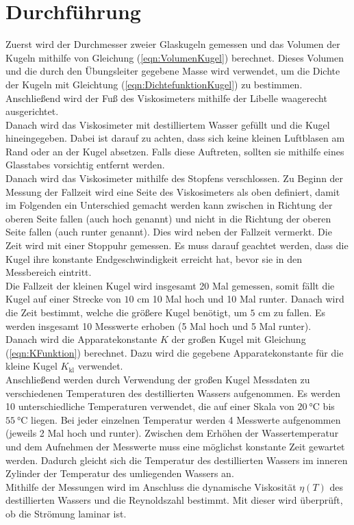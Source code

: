 \section{Durchführung}
\label{sec:Durchführung}
Zuerst wird der Durchmesser zweier Glaskugeln gemessen und das Volumen der Kugeln mithilfe von Gleichung
(\ref{eqn:VolumenKugel}) berechnet. Dieses Volumen und die durch den Übungsleiter gegebene Masse 
wird verwendet, um die Dichte der Kugeln mit Gleichtung 
(\ref{eqn:DichtefunktionKugel}) zu bestimmen.  
Anschließend wird der Fuß des Viskosimeters mithilfe der Libelle waagerecht ausgerichtet. \\
Danach wird das Viskosimeter mit destilliertem Wasser gefüllt und die Kugel hineingegeben. 
Dabei ist darauf zu achten, dass sich keine kleinen Luftblasen am Rand oder an der Kugel absetzen. 
Falls diese Auftreten, sollten sie mithilfe eines Glasstabes vorsichtig entfernt werden. \\
Danach wird 
das Viskosimeter mithilfe des Stopfens verschlossen. Zu Beginn der Messung der Fallzeit wird eine Seite 
des Viskosimeters als oben definiert, damit im Folgenden ein Unterschied gemacht werden kann zwischen 
\glqq in Richtung der oberen Seite fallen\grqq{} (auch \glqq hoch\grqq{} genannt) und \glqq nicht in die Richtung der 
oberen Seite fallen\grqq{}
(auch \glqq runter\grqq{} genannt). Dies wird neben der Fallzeit vermerkt. Die Zeit wird mit einer Stoppuhr gemessen. 
Es muss darauf geachtet werden, dass
die Kugel ihre konstante Endgeschwindigkeit erreicht hat, bevor sie in den Messbereich eintritt.\\ 
Die Fallzeit der kleinen Kugel wird insgesamt 20 Mal gemessen, somit fällt die Kugel auf einer Strecke 
von $10$ \unit{\centi\meter} 10 Mal \glqq hoch\grqq{} und 10 Mal\glqq 
runter\grqq{}. Danach wird die Zeit bestimmt, welche die größere Kugel benötigt, um $5$ \unit{\centi\meter} zu fallen.
Es werden insgesamt 10 Messwerte erhoben (5 Mal \glqq hoch\grqq{} und 5 Mal \glqq runter\grqq{}).\\
Danach wird die Apparatekonstante $K$ der großen Kugel mit Gleichung (\ref{eqn:KFunktion}) berechnet. Dazu wird die gegebene 
Apparatekonstante für die kleine Kugel $K_{\text{kl}}$ %
verwendet. \\
Anschließend werden durch Verwendung der großen Kugel Messdaten zu verschiedenen Temperaturen des 
destillierten Wassers aufgenommen. 
Es werden 10 unterschiedliche Temperaturen verwendet, die auf einer Skala von $\SI{20}{\celsius}$ bis 
$\SI{55}{\celsius}$ liegen. Bei jeder einzelnen Temperatur werden 4 Messwerte aufgenommen (jeweils 2 Mal 
\glqq hoch\grqq{} und \glqq runter\grqq{}).
Zwischen dem Erhöhen der Wassertemperatur und dem Aufnehmen der Messwerte muss eine möglichst konstante Zeit 
gewartet werden. Dadurch gleicht sich die Temperatur des destillierten Wassers im inneren Zylinder der Temperatur des umliegenden 
Wassers an. \\
Mithilfe der Messungen wird im Anschluss die dynamische Viskosität $\eta(T)$ des destillierten Wassers und die 
Reynoldszahl bestimmt. Mit dieser wird überprüft, ob die Strömung laminar ist.

